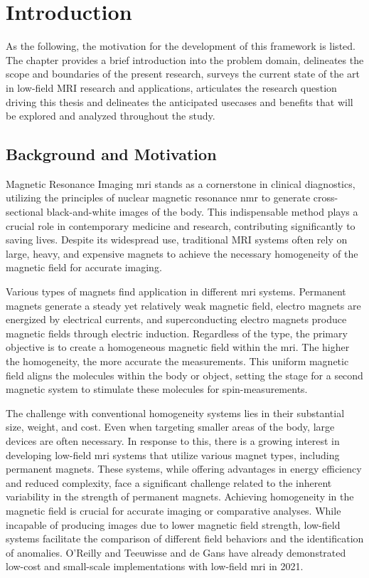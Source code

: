 \hypertarget{introduction}{%
\chapter{Introduction}\label{introduction}}

As the following, the motivation for the development of this framework
is listed. The chapter provides a brief introduction into the problem
domain, delineates the scope and boundaries of the present research,
surveys the current state of the art in low-field MRI research and
applications, articulates the research question driving this thesis and
delineates the anticipated usecases and benefits that will be explored
and analyzed throughout the study.

\hypertarget{background-and-motivation}{%
\section{Background and Motivation}\label{background-and-motivation}}

Magnetic Resonance Imaging \gls{mri} stands as a cornerstone in clinical
diagnostics, utilizing the principles of nuclear magnetic resonance
\gls{nmr} to generate cross-sectional black-and-white images of the
body. This indispensable method plays a crucial role in contemporary
medicine and research, contributing significantly to saving lives.
Despite its widespread use, traditional MRI systems often rely on large,
heavy, and expensive magnets to achieve the necessary homogeneity of the
magnetic field for accurate imaging. \cite{Nitz2016}

Various types of magnets find application in different \gls{mri}
systems. Permanent magnets generate a steady yet relatively weak
magnetic field, electro magnets are energized by electrical currents,
and superconducting electro magnets produce magnetic fields through
electric induction. Regardless of the type, the primary objective is to
create a homogeneous magnetic field within the \gls{mri}. The higher the
homogeneity, the more accurate the measurements. This uniform magnetic
field aligns the molecules within the body or object, setting the stage
for a second magnetic system to stimulate these molecules for
spin-measurements.

The challenge with conventional homogeneity systems lies in their
substantial size, weight, and cost. Even when targeting smaller areas of
the body, large devices are often necessary. In response to this, there
is a growing interest in developing low-field \gls{mri} systems that
utilize various magnet types, including permanent magnets. These
systems, while offering advantages in energy efficiency and reduced
complexity, face a significant challenge related to the inherent
variability in the strength of permanent magnets. Achieving homogeneity
in the magnetic field is crucial for accurate imaging or comparative
analyses. While incapable of producing images due to lower magnetic
field strength, low-field systems facilitate the comparison of different
field behaviors and the identification of anomalies. O'Reilly and
Teeuwisse and de Gans \cite{OReilly2019-rn} have already
demonstrated low-cost and small-scale implementations with low-field
\gls{mri} in 2021.

